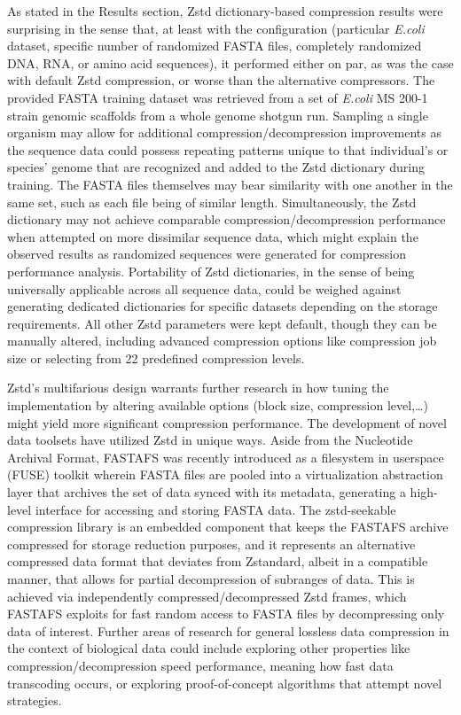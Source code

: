 \documentclass[
  10pt,
  letterpaper,
]{article}
\begin{document}
As stated in the Results section, Zstd dictionary-based compression
results were surprising in the sense that, at least with the
configuration (particular \emph{E.coli} dataset, specific number of
randomized FASTA files, completely randomized DNA, RNA, or amino acid
sequences), it performed either on par, as was the case with default
Zstd compression, or worse than the alternative compressors. The
provided FASTA training dataset was retrieved from a set of
\textit{E.coli} MS 200-1 strain genomic scaffolds from a whole genome
shotgun run\citep{ncbi}. Sampling a single organism may allow for
additional compression/decompression improvements as the sequence data
could possess repeating patterns unique to that individual's or species'
genome that are recognized and added to the Zstd dictionary during
training. The FASTA files themselves may bear similarity with one
another in the same set, such as each file being of similar length.
Simultaneously, the Zstd dictionary may not achieve comparable
compression/decompression performance when attempted on more dissimilar
sequence data, which might explain the observed results as randomized
sequences were generated for compression performance analysis.
Portability of Zstd dictionaries, in the sense of being universally
applicable across all sequence data, could be weighed against generating
dedicated dictionaries for specific datasets depending on the storage
requirements. All other Zstd parameters were kept default, though they
can be manually altered, including advanced compression options like
compression job size or selecting from 22 predefined compression
levels\citep{facebook}.

Zstd's multifarious design warrants further research in how tuning the
implementation by altering available options (block size, compression
level,\ldots) might yield more significant compression performance. The
development of novel data toolsets have utilized Zstd in unique ways.
Aside from the Nucleotide Archival Format, FASTAFS was recently
introduced as a filesystem in userspace (FUSE) toolkit wherein FASTA
files are pooled into a virtualization abstraction layer that archives
the set of data synced with its metadata, generating a high-level
interface for accessing and storing FASTA data\citep{fastafs}. The
zstd-seekable compression library is an embedded component that keeps
the FASTAFS archive compressed for storage reduction purposes, and it
represents an alternative compressed data format that deviates from
Zstandard, albeit in a compatible manner, that allows for partial
decompression of subranges of data\citep{facebook}. This is achieved via
independently compressed/decompressed Zstd frames, which FASTAFS
exploits for fast random access to FASTA files by decompressing only
data of interest. Further areas of research for general lossless data
compression in the context of biological data could include exploring
other properties like compression/decompression speed performance,
meaning how fast data transcoding occurs, or exploring proof-of-concept
algorithms that attempt novel strategies.
\end{document}

